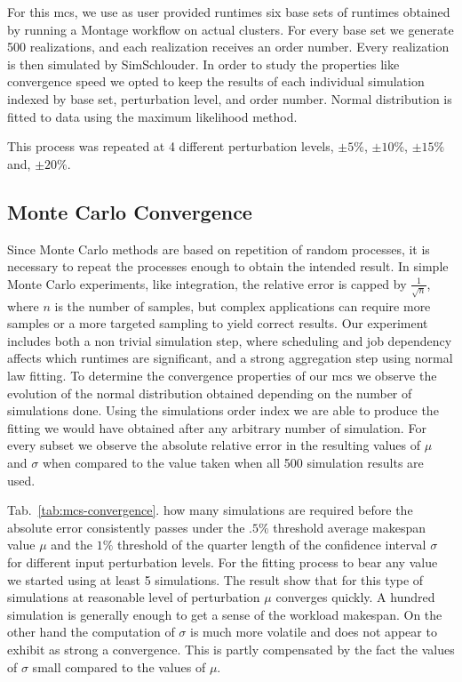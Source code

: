 \documentclass[10pt,conference,compsocconf]{IEEEtran}
\newcommand{\pmpc}[1]{$\pm#1\%$}
\begin{document}
For this \ac{mcs}, we use  as user provided runtimes six base sets
of runtimes obtained  by running a Montage\cite{montage2009}  workflow on actual
clusters.  For every base set we generate 500 realizations, and each realization
receives an order number.  Every  realization is then simulated by SimSchlouder.
In order  to study the  properties like convergence speed  we opted to  keep the
results of each  individual simulation indexed by base  set, perturbation level,
and  order number.   Normal distribution  is fitted  to data  using the  maximum
likelihood method.

This process was repeated at 4 different perturbation levels, \pmpc{5},
\pmpc{10}, \pmpc{15} and, \pmpc{20}.

\subsection{Monte Carlo Convergence}

Since Monte Carlo methods are based on repetition of random processes, it is
necessary to repeat the processes enough to obtain the intended result. In
simple Monte Carlo experiments, like integration, the relative error is capped
by $\frac{1}{\sqrt{n}}$, where $n$ is the number of samples, but complex applications
can require more samples or a more targeted sampling to yield correct
results. Our experiment includes both a non trivial simulation step, where
scheduling and job dependency affects which runtimes are significant, and a
strong aggregation step using normal law fitting. To determine the
convergence properties of our \ac{mcs} we observe the evolution
of the normal distribution obtained depending on the number of simulations done. 
Using the simulations order index we are able to produce the fitting we would
have obtained after any arbitrary number of simulation. For every subset we
observe the absolute relative error in the resulting values of $\mu$ and $\sigma$ 
when compared to the value taken when all 500 simulation results are used. 

Tab.~\ref{tab:mcs-convergence}. how many simulations are required before the
absolute error consistently passes under the $.5\%$ threshold average makespan
value $\mu$ and the $1\%$ threshold of the quarter length of the confidence
interval $\sigma$ for different input perturbation levels. For the fitting
process to bear any value we started using at least 5 simulations. The result
show that for this type of simulations at reasonable level of perturbation $\mu$
converges quickly. A hundred simulation is generally enough to get a sense of
the workload makespan. On the other hand the computation of $\sigma$ is much
more volatile and does not appear to exhibit  as strong a convergence. This is
partly compensated by the fact the values of $\sigma$ small compared to the
values of $\mu$.
\end{document}
